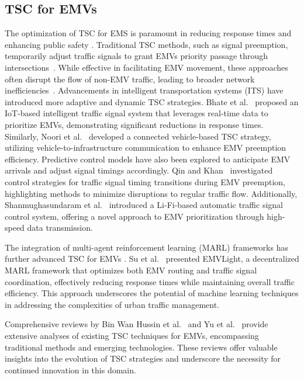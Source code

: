 \subsection{TSC for EMVs}\label{tsc_for_emvs}
The optimization of TSC for EMS is paramount in reducing response times and enhancing public safety \cite{lam2023large,you2023bootstrapping,yang2023multimodal}. Traditional TSC methods, such as signal preemption, temporarily adjust traffic signals to grant EMVs priority passage through intersections~\cite{obeck1991traffic}. While effective in facilitating EMV movement, these approaches often disrupt the flow of non-EMV traffic, leading to broader network inefficiencies~\cite{hashim2013traffic}. Advancements in intelligent transportation systems (ITS) have introduced more adaptive and dynamic TSC strategies. Bhate et al.~\cite{bhate2018iot} proposed an IoT-based intelligent traffic signal system that leverages real-time data to prioritize EMVs, demonstrating significant reductions in response times. Similarly, Noori et al.~\cite{noori2016connected} developed a connected vehicle-based TSC strategy, utilizing vehicle-to-infrastructure communication to enhance EMV preemption efficiency.
Predictive control models have also been explored to anticipate EMV arrivals and adjust signal timings accordingly. Qin and Khan~\cite{qin2012control} investigated control strategies for traffic signal timing transitions during EMV preemption, highlighting methods to minimize disruptions to regular traffic flow. Additionally, Shanmughasundaram et al.~\cite{shanmughasundaram2018li} introduced a Li-Fi-based automatic traffic signal control system, offering a novel approach to EMV prioritization through high-speed data transmission.

The integration of multi-agent reinforcement learning (MARL) frameworks has further advanced TSC for EMVs \cite{li2023nonconvex}. Su et al.~\cite{su2023emvlight} presented EMVLight, a decentralized MARL framework that optimizes both EMV routing and traffic signal coordination, effectively reducing response times while maintaining overall traffic efficiency. This approach underscores the potential of machine learning techniques in addressing the complexities of urban traffic management.

Comprehensive reviews by Bin Wan Hussin et al.~\cite{bin2019review} and Yu et al.~\cite{yu2022state} provide extensive analyses of existing TSC techniques for EMVs, encompassing traditional methods and emerging technologies. These reviews offer valuable insights into the evolution of TSC strategies and underscore the necessity for continued innovation in this domain.
